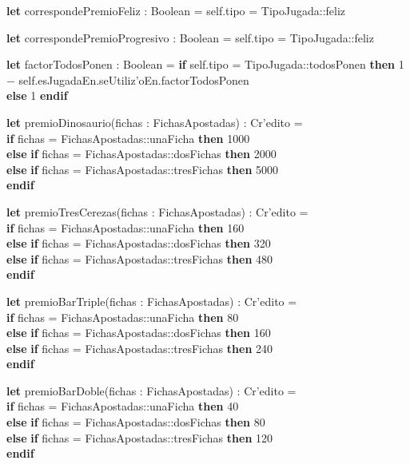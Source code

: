 \begin{itemize}
    \textbf{let} correspondePremioFeliz : Boolean = self.tipo = TipoJugada::feliz
    
    \textbf{let} correspondePremioProgresivo : Boolean = self.tipo = TipoJugada::feliz
    
    \textbf{let} factorTodosPonen : Boolean = \textbf{if} self.tipo = TipoJugada::todosPonen \textbf{then} 1 $-$ self.esJugadaEn.seUtiliz'oEn.factorTodosPonen\\ \textbf{else} 1 \textbf{endif}

    \textbf{let} premioDinosaurio(fichas : FichasApostadas) : Cr'edito =\\
        \textbf{if} fichas = FichasApostadas::unaFicha \textbf{then} 1000\\
        \textbf{else} \textbf{if} fichas = FichasApostadas::dosFichas \textbf{then} 2000\\
        \textbf{else} \textbf{if} fichas = FichasApostadas::tresFichas \textbf{then} 5000\\
        \textbf{endif}

    \textbf{let} premioTresCerezas(fichas : FichasApostadas) : Cr'edito =\\
        \textbf{if} fichas = FichasApostadas::unaFicha \textbf{then} 160\\
        \textbf{else} \textbf{if} fichas = FichasApostadas::dosFichas \textbf{then} 320\\
        \textbf{else} \textbf{if} fichas = FichasApostadas::tresFichas \textbf{then} 480\\
        \textbf{endif}

    \textbf{let} premioBarTriple(fichas : FichasApostadas) : Cr'edito =\\
        \textbf{if} fichas = FichasApostadas::unaFicha \textbf{then} 80\\
        \textbf{else} \textbf{if} fichas = FichasApostadas::dosFichas \textbf{then} 160\\
        \textbf{else} \textbf{if} fichas = FichasApostadas::tresFichas \textbf{then} 240\\
        \textbf{endif}

    \textbf{let} premioBarDoble(fichas : FichasApostadas) : Cr'edito =\\
        \textbf{if} fichas = FichasApostadas::unaFicha \textbf{then} 40\\
        \textbf{else} \textbf{if} fichas = FichasApostadas::dosFichas \textbf{then} 80\\
        \textbf{else} \textbf{if} fichas = FichasApostadas::tresFichas \textbf{then} 120\\
        \textbf{endif}


\end{itemize}
